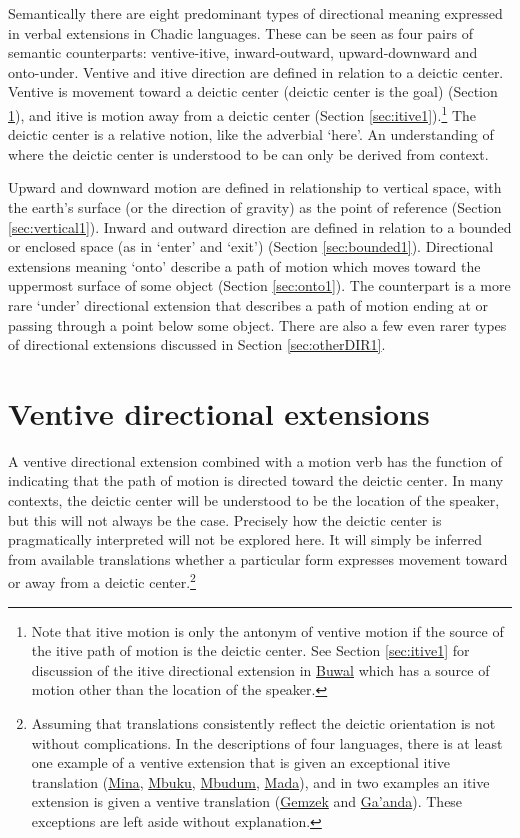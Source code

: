 Semantically there are eight predominant types of directional meaning expressed in verbal extensions in Chadic languages. These can be seen as four pairs of semantic counterparts: ventive-itive, inward-outward, upward-downward and onto-under. Ventive and itive direction are defined in relation to a deictic center. Ventive is movement toward a deictic center (deictic center is the goal) (Section \ref{sec:vent1}), and itive is motion away from a deictic center (Section \ref{sec:itive1}).\footnote{Note that itive motion is only the antonym of ventive motion if the source of the itive path of motion is the deictic center. See Section \ref{sec:itive1} for discussion of the itive directional extension in \hyperref[buwa]{Buwal} which has a source of motion other than the location of the speaker.} The deictic center is a relative notion, like the adverbial `here'. An understanding of where the deictic center is understood to be can only be derived from context. 

Upward and downward motion are defined in relationship to vertical space, with the earth's surface (or the direction of gravity) as the point of reference (Section \ref{sec:vertical1}). Inward and outward direction are defined in relation to a bounded or enclosed space (as in `enter' and `exit') (Section \ref{sec:bounded1}). Directional extensions meaning `onto' describe a path of motion which moves toward the uppermost surface of some object (Section \ref{sec:onto1}). The counterpart is a more rare `under' directional extension that describes a path of motion ending at or passing through a point below some object. There are also a few even rarer types of directional extensions discussed in Section \ref{sec:otherDIR1}.

\section{Ventive directional extensions} \label{sec:vent1}

A ventive directional extension combined with a motion verb has the function of indicating that the path of motion is directed toward the deictic center. In many contexts, the deictic center will be understood to be the location of the speaker, but this will not always be the case. Precisely how the deictic center is pragmatically interpreted will not be explored here. It will simply be inferred from available translations whether a particular form expresses movement toward or away from a deictic center.\footnote{Assuming that translations consistently reflect the deictic orientation is not without complications. In the descriptions of four languages, there is at least one example of a ventive extension that is given an exceptional itive translation (\hyperref[mina]{Mina}, \hyperref[mbuk]{Mbuku}, \hyperref[mbud]{Mbudum}, \hyperref[mada]{Mada}), and in two examples an itive extension is given a ventive translation (\hyperref[zulg]{Gemzek} and \hyperref[gaan]{Ga'anda}). These exceptions are left aside without explanation.} 

